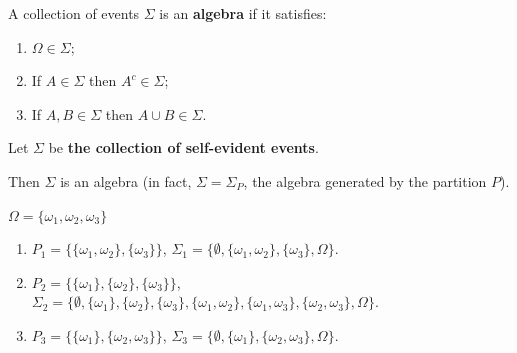 \documentclass[11pt]{elegantbook_2}
\begin{document}
\begin{definition}[Algebra]
    A collection of events $\Sigma$ is an \textbf{algebra} if it satisfies:
    \begin{enumerate}
        \item $\Omega\in\Sigma$;
        \item If $A\in\Sigma$ then $A^c\in\Sigma$;
        \item If $A,B\in\Sigma$ then $A\cup B\in\Sigma$.
    \end{enumerate}
\end{definition}
Let $\Sigma$ be \textbf{the collection of self-evident events}.
\begin{corollary}
    Then $\Sigma$ is an algebra (in fact, $\Sigma = \Sigma_P$, the algebra generated by the partition $P$).
\end{corollary}

\begin{example}
    $\Omega=\{\omega_1,\omega_2,\omega_3\}$
    \begin{enumerate}
        \item $P_1=\{\{\omega_1,\omega_2\},\{\omega_3\}\}$, $\Sigma_1=\{\emptyset,\{\omega_1,\omega_2\},\{\omega_3\},\Omega\}$.
        \item $P_2=\{\{\omega_1\},\{\omega_2\},\{\omega_3\}\}$, $\Sigma_2=\{\emptyset,\{\omega_1\},\{\omega_2\},\{\omega_3\},\{\omega_1,\omega_2\},\{\omega_1,\omega_3\},\{\omega_2,\omega_3\},\Omega\}$.
        \item $P_3=\{\{\omega_1\},\{\omega_2,\omega_3\}\}$, $\Sigma_3=\{\emptyset,\{\omega_1\},\{\omega_2,\omega_3\},\Omega\}$.
    \end{enumerate}
\end{example}
\end{document}
